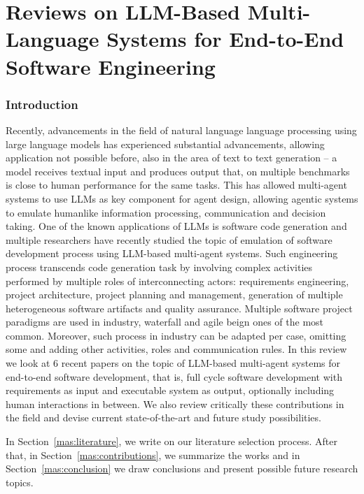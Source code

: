 \setcounter{page}{1}
\section{Reviews on LLM-Based Multi-Language Systems for End-to-End Software Engineering}

\subsubsection{Introduction}
\label{mas:intro}

Recently, advancements in the field of natural language language processing using large language models has experienced substantial advancements, allowing application not possible before, also in the area of text to text generation -- a model receives textual input and produces output that, on multiple benchmarks is close to human performance for the same tasks. This has allowed multi-agent systems to use LLMs as key component for agent design, allowing agentic systems to emulate humanlike information processing, communication and decision taking. One of the known applications of LLMs is software code generation and multiple researchers have recently studied the topic of emulation of software development process using LLM-based multi-agent systems. Such engineering process transcends code generation task by involving complex activities performed by multiple roles of interconnecting actors: requirements engineering, project architecture, project planning and management, generation of multiple heterogeneous software artifacts and quality assurance. Multiple software project paradigms are used in industry, waterfall and agile beign ones of the most common. Moreover, such process in industry can be adapted per case, omitting some and adding other activities, roles and communication rules. In this review we look at 6 recent papers on the topic of LLM-based multi-agent systems for end-to-end software development, that is, full cycle software development with requirements as input and executable system as output, optionally including human interactions in between. We also review critically these contributions in the field and devise current state-of-the-art and future study possibilities.

In Section~\ref{mas:literature}, we write on our literature selection process. After that, in Section~\ref{mas:contributions}, we summarize the works and in Section~\ref{mas:conclusion} we draw conclusions and present possible future research topics.

